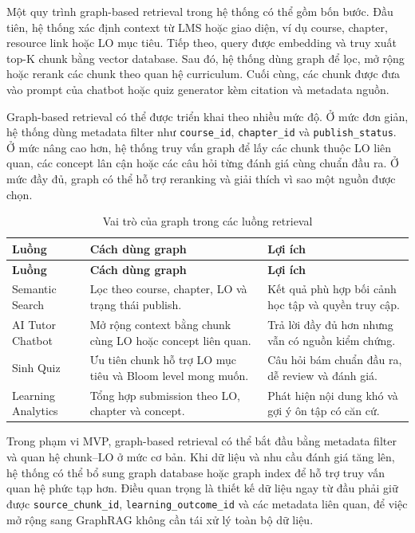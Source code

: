 Một quy trình graph-based retrieval trong hệ thống có thể gồm bốn bước. Đầu
tiên, hệ thống xác định context từ LMS hoặc giao diện, ví dụ course, chapter,
resource link hoặc LO mục tiêu. Tiếp theo, query được embedding và truy xuất
top-K chunk bằng vector database. Sau đó, hệ thống dùng graph để lọc, mở rộng
hoặc rerank các chunk theo quan hệ curriculum. Cuối cùng, các chunk được đưa vào
prompt của chatbot hoặc quiz generator kèm citation và metadata nguồn.

Graph-based retrieval có thể được triển khai theo nhiều mức độ. Ở mức đơn giản,
hệ thống dùng metadata filter như \texttt{course\_id}, \texttt{chapter\_id} và
\texttt{publish\_status}. Ở mức nâng cao hơn, hệ thống truy vấn graph để lấy các
chunk thuộc LO liên quan, các concept lân cận hoặc các câu hỏi từng đánh giá cùng
chuẩn đầu ra. Ở mức đầy đủ, graph có thể hỗ trợ reranking và giải thích vì sao
một nguồn được chọn.

\begin{longtable}{|p{3.2cm}|p{4.5cm}|p{6.3cm}|}
\caption{Vai trò của graph trong các luồng retrieval}
\label{tab:graph-based-retrieval-roles}\\
\hline
\textbf{Luồng} & \textbf{Cách dùng graph} & \textbf{Lợi ích} \\
\hline
\endfirsthead
\hline
\textbf{Luồng} & \textbf{Cách dùng graph} & \textbf{Lợi ích} \\
\hline
\endhead
Semantic Search & Lọc theo course, chapter, LO và trạng thái publish. & Kết quả phù hợp bối cảnh học tập và quyền truy cập. \\
\hline
AI Tutor Chatbot & Mở rộng context bằng chunk cùng LO hoặc concept liên quan. & Trả lời đầy đủ hơn nhưng vẫn có nguồn kiểm chứng. \\
\hline
Sinh Quiz & Ưu tiên chunk hỗ trợ LO mục tiêu và Bloom level mong muốn. & Câu hỏi bám chuẩn đầu ra, dễ review và đánh giá. \\
\hline
Learning Analytics & Tổng hợp submission theo LO, chapter và concept. & Phát hiện nội dung khó và gợi ý ôn tập có căn cứ. \\
\hline
\end{longtable}

Trong phạm vi MVP, graph-based retrieval có thể bắt đầu bằng metadata filter và
quan hệ chunk--LO ở mức cơ bản. Khi dữ liệu và nhu cầu đánh giá tăng lên, hệ
thống có thể bổ sung graph database hoặc graph index để hỗ trợ truy vấn quan hệ
phức tạp hơn. Điều quan trọng là thiết kế dữ liệu ngay từ đầu phải giữ được
\texttt{source\_chunk\_id}, \texttt{learning\_outcome\_id} và các metadata liên
quan, để việc mở rộng sang GraphRAG không cần tái xử lý toàn bộ dữ liệu.

